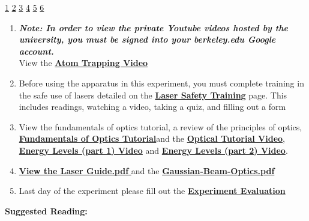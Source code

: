 \documentclass{../lab}
\begin{document}
\signatures \hyperlink{Power}{1} \hyperlink{Two Quarter-Wave Plates}{2} \hyperlink{Four Peaks}{3} \hyperlink{Adjustments}{4} \hyperlink{Results and Steps}{5} \hyperlink{Methods of Measuring Temperature}{6}

\begin{enumerate}
    \item \emph{\textbf{Note: In order to view the private Youtube videos hosted by the university, you must be signed into your berkeley.edu Google account.}}\\
    View the \href{http://youtu.be/1n4QumeydQ4}{\textbf{Atom Trapping Video}}

    \item Before using the apparatus in this experiment, you must complete training in the safe use of lasers detailed on the \href{https://berkeley-physics111b.github.io/safety/laser/}{\textbf{Laser Safety Training}} page. This includes readings, watching a video, taking a quiz, and filling out a form

    \item View the fundamentals of optics tutorial, a review of the principles of optics,\textbf{ }\href{https://berkeley-physics111b.github.io/assets/pdf/oldwebsitestructure/QIE/fundamental-Optics.pdf}{\textbf{\textbf{Fundamentals of Optics Tutorial}}}and the \href{http://youtu.be/zUGBt5vc5FA}{\textbf{Optical Tutorial Video}}, \href{http://youtu.be/wyBOVjU5bBQ}{\textbf{Energy Levels (part 1) Video}} and \href{http://youtu.be/Eypw0DmVBxk}{\textbf{Energy Levels (part 2) Video}}.

    \item \href{https://berkeley-physics111b.github.io/assets/pdf/oldwebsitestructure/MOT/Laser-Guide.pdf}{\textbf{\textbf{View the Laser Guide.pdf }}}and the \href{https://berkeley-physics111b.github.io/assets/pdf/oldwebsitestructure/MOT/Gaussian-Beam-Optics.pdf}{\textbf{Gaussian-Beam-Optics.pdf}}

    \item Last day of the experiment please fill out the \href{\ExperimentEvaluation}{\textbf{Experiment Evaluation}}
\end{enumerate}

\textbf{Suggested Reading:}
\end{document}
